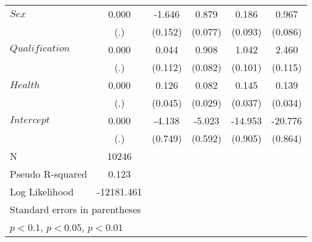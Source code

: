 {\begin{tabular}{l*{5}{c}}
$\mathit{Sex}$&       0.000         &      -1.646\sym{***}&       0.879\sym{***}&       0.186\sym{**} &       0.967\sym{***}\\
            &         (.)         &     (0.152)         &     (0.077)         &     (0.093)         &     (0.086)         \\
$\mathit{Qualification}$&       0.000         &       0.044         &       0.908\sym{***}&       1.042\sym{***}&       2.460\sym{***}\\
            &         (.)         &     (0.112)         &     (0.082)         &     (0.101)         &     (0.115)         \\
$\mathit{Health}$&       0.000         &       0.126\sym{***}&       0.082\sym{***}&       0.145\sym{***}&       0.139\sym{***}\\
            &         (.)         &     (0.045)         &     (0.029)         &     (0.037)         &     (0.034)         \\
$\mathit{Intercept}$&       0.000         &      -4.138\sym{***}&      -5.023\sym{***}&     -14.953\sym{***}&     -20.776\sym{***}\\
            &         (.)         &     (0.749)         &     (0.592)         &     (0.905)         &     (0.864)         \\
\hline
N           &       10246         &                     &                     &                     &                     \\
Pseudo R-squared&       0.123         &                     &                     &                     &                     \\
Log Likelihood&  -12181.461         &                     &                     &                     &                     \\
\hline\hline
\multicolumn{6}{l}{\footnotesize Standard errors in parentheses}\\
\multicolumn{6}{l}{\footnotesize \sym{*} \(p<0.1\), \sym{**} \(p<0.05\), \sym{***} \(p<0.01\)}\\
\end{tabular}
}
